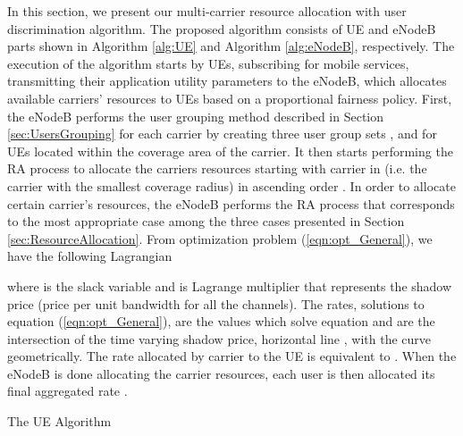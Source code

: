 \documentclass[journal]{IEEEtran} 				\IEEEoverridecommandlockouts 						\usepackage{amsmath,amssymb}
\begin{document}
In this section, we present our multi-carrier resource allocation with user discrimination algorithm. The proposed algorithm consists of UE and eNodeB parts shown in Algorithm \ref{alg:UE} and Algorithm \ref{alg:eNodeB}, respectively. The execution of the algorithm starts by UEs, subscribing for mobile services, transmitting their application utility parameters to the eNodeB, which allocates available carriers' resources to UEs based on a proportional fairness policy. First, the eNodeB performs the user grouping method described in Section \ref{sec:UsersGrouping} for each carrier by creating three user group sets ,  and  for UEs located within the coverage area of the  carrier. It then starts performing the RA process to allocate the carriers resources starting with carrier  in  (i.e. the carrier with the smallest coverage radius) in ascending order . In order to allocate certain carrier's resources, the eNodeB performs the RA process that corresponds to the most appropriate case among the three cases presented in Section \ref{sec:ResourceAllocation}. From optimization problem (\ref{eqn:opt_General}), we have the following Lagrangian



where  is the slack variable and  is Lagrange multiplier that represents the shadow price (price per unit bandwidth for all the  channels). The rates, solutions to equation (\ref{eqn:opt_General}), are the values  which solve equation  and are the intersection of the time varying shadow price, horizontal line , with the curve  geometrically. The rate allocated by carrier  to the  UE is equivalent to . When the eNodeB is done allocating the  carrier resources, each user is then allocated its final aggregated rate .

\begin{algorithm}
\caption{The  UE Algorithm}\label{alg:UE}
\begin{algorithmic}
\LOOP
\ENDLOOP
\end{algorithmic}
\end{algorithm}
\end{document}
